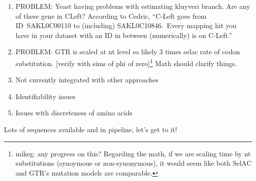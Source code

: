 \documentclass{article}
\newcommand{\selac}{SelAC\xspace}
\newcommand{\aoptvec}{\ensuremath{\Vec{a}_*}\xspace}
\begin{document}
\begin{enumerate}
Thus, while our assumption of about the link between functionality and physicochemical distance may be reasonable for sequences close to the optimum sequence \aoptvec, it clearly fails for protein sequences far from the optimum.
\footnote{mikeg: Two thoughts.
One, because we are integrating over G rather than using the MLE estimate in this calculation, I'm wondering if we are substantially under estimating the effect of a few sites with high senstivities would have on protein function.
If it is not hard to do, we could evaluate the model at the MLE parameters and then find the optimal G for each position.
Two, if the true values of G follow a heavy tailed distribution, it may make more sense to try and model G using an inverse-gamma distribution.
}
This implies that the difference in expression between a random sequence and the observed sequence would only be on the order of  \_\_\_\_\_-fold.
It is important to note that the this does not mean that selection is ineffective in our model.
The log of the selection coefficient between two alleles depends on both their functionality and the gene's target expression level $\psi$.
Thus for high expression genes, slight changes in functionality can still lead to large differences in fitnesses between alleles.
\item PROBLEM: Yeast having problems with estimating kluyveri branch.  Are any of these gene in CLeft?
  According to Cedric, ``C-Left goes from ID SAKL0C00110 to (including) SAKL0C10846. Every mapping hit you have in your dataset with an ID in between (numerically) is on C-Left.''
\item PROBLEM: GTR is scaled at nt level so likely 3 times selac rate of codon substitution. [verify with sims of phi of zero]\footnote{mikeg: any progress on this?
Regarding the math, if we are scaling time by nt substitutions (synoymous or non-synonymous), it would seem like both \selac and GTR's mutation models are comparable.
}
  Math should clarify things.
\item Not currently integrated with other approaches
\item Identifiability issues
\item Issues with discreteness of amino acids
\end{enumerate}

 Lots of sequences available and in pipeline, let's get to it!
\end{document}
